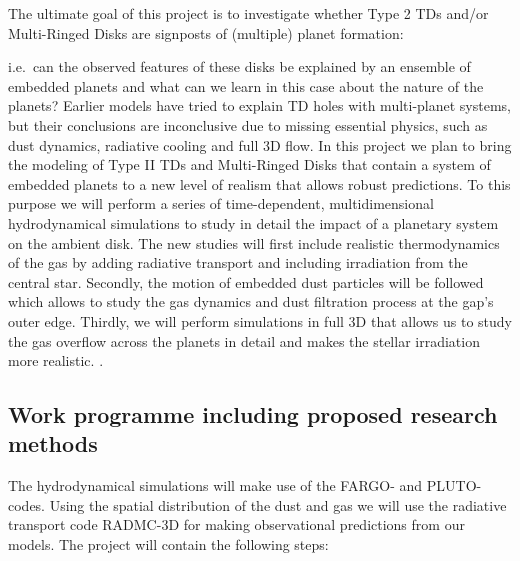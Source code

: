 \documentclass[10pt,fleqn,twoside]{article}
\begin{document}
\begin{highlight}
The ultimate goal of this project is to investigate whether Type 2 TDs 
and/or Multi-Ringed Disks are signposts of (multiple) planet formation: 
\end{highlight}
i.e.\ can the observed features of these disks
be explained by an ensemble of embedded planets and what can we learn in this case about the nature
of the planets?
Earlier models have tried to explain TD holes with multi-planet systems, but their
conclusions are inconclusive due to missing essential physics, such as dust dynamics, radiative cooling and
full 3D flow.
In this project we plan to bring the modeling of Type II TDs and Multi-Ringed Disks 
that contain a system of embedded planets to a new level of realism
that allows robust predictions.
To this purpose we will perform a series of time-dependent, multidimensional hydrodynamical simulations to study in detail the impact of
a planetary system on the ambient disk. The new studies will first include realistic thermodynamics of the gas by adding radiative transport
and including irradiation from the central star. Secondly, the motion of embedded dust particles will be followed
which allows to study the gas dynamics and dust filtration process at the gap's outer edge.
Thirdly, we will perform simulations in full 3D that allows us to study the gas overflow
across the planets in detail and makes the stellar irradiation more realistic.
.


\subsection{Work programme including proposed research methods}

%
The hydrodynamical simulations will make use of the FARGO- and {PLUTO}-codes.
Using the spatial distribution of the dust and gas we will use the radiative transport
code RADMC-3D for making observational predictions from our models.
The project will contain the following steps:
\end{document}
